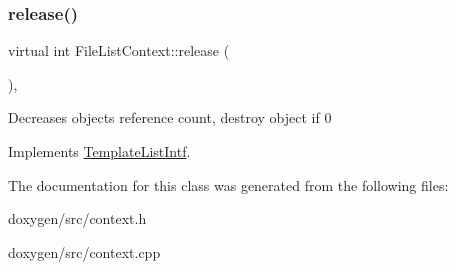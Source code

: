 \mbox{\label{class_file_list_context_a757f759e1158e2c2859cb86b483fcd51}} 
\subsubsection{\texorpdfstring{release()}{release()}}
{\footnotesize\ttfamily virtual int File\+List\+Context\+::release (\begin{DoxyParamCaption}{ }\end{DoxyParamCaption})\hspace{0.3cm}{\ttfamily [inline]}, {\ttfamily [virtual]}}

Decreases object\textquotesingle{}s reference count, destroy object if 0 

Implements \mbox{\hyperlink{class_template_list_intf_a0c53169c740c09dac47efc62bbe39674}{Template\+List\+Intf}}.



The documentation for this class was generated from the following files\+:\begin{DoxyCompactItemize}
\item 
doxygen/src/context.\+h\item 
doxygen/src/context.\+cpp\end{DoxyCompactItemize}
